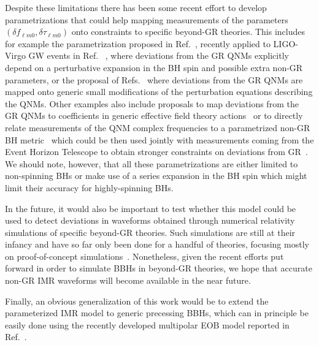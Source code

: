 Despite these limitations there has been some recent effort to develop
parametrizations that could help mapping measurements of the
parameters $(\delta f_{\ell m 0}, \delta \tau_{\ell m0})$ onto
constraints to specific beyond-GR theories. This includes for example
the parametrization proposed in Ref.~\cite{Maselli:2019mjd}, recently
applied to LIGO-Virgo GW events in Ref. ~\cite{Carullo:2021dui}, where
deviations from the GR QNMs explicitly depend on a perturbative
expansion in the BH spin and possible extra non-GR parameters, or the
proposal of Refs.~\cite{Cardoso:2019mqo,McManus:2019ulj} where
deviations from the GR QNMs are mapped onto generic small
modifications of the perturbation equations describing the QNMs. Other
examples also include proposals to map deviations from the GR QNMs to
coefficients in generic effective field theory
actions~\cite{Cardoso:2018ptl,Franciolini:2018uyq,Cano:2020cao} or to
directly relate measurements of the QNM complex frequencies to a
parametrized non-GR BH
metric~\cite{Glampedakis:2017dvb,Suvorov:2021amy,Volkel:2020daa} which
could be then used jointly with measurements coming from the Event
Horizon Telescope to obtain stronger constraints on deviations from
GR~\cite{Volkel:2020daa,Volkel:2020xlc,Psaltis:2020lvx,Yang:2021zqy}.
We should note, however, that all these parametrizations are either
limited to non-spinning BHs or make use of a series expansion in the
BH spin which might limit their accuracy for highly-spinning BHs.

In the future, it would also be important to test whether this model
could be used to detect deviations in waveforms obtained through
numerical relativity simulations of specific beyond-GR theories. Such
simulations are still at their infancy and have so far only been done
for a handful of theories, focusing mostly on proof-of-concept
simulations~\cite{Healy:2011ef,Berti:2013gfa,Cao:2013osa,Okounkova:2017yby,Hirschmann:2017psw,Witek:2018dmd,Okounkova:2019dfo,Okounkova:2019zjf,Okounkova:2020rqw,East:2020hgw}. Nonetheless,
given the recent efforts put forward in order to simulate BBHs in
beyond-GR theories, we hope that accurate non-GR IMR waveforms will
become available in the near future.

Finally, an obvious generalization of this work would be to extend the
parameterized IMR model to generic precessing BBHs, which can in
principle be easily done using the recently developed multipolar EOB
model reported in Ref.~\cite{Ossokine:2020kjp}.
